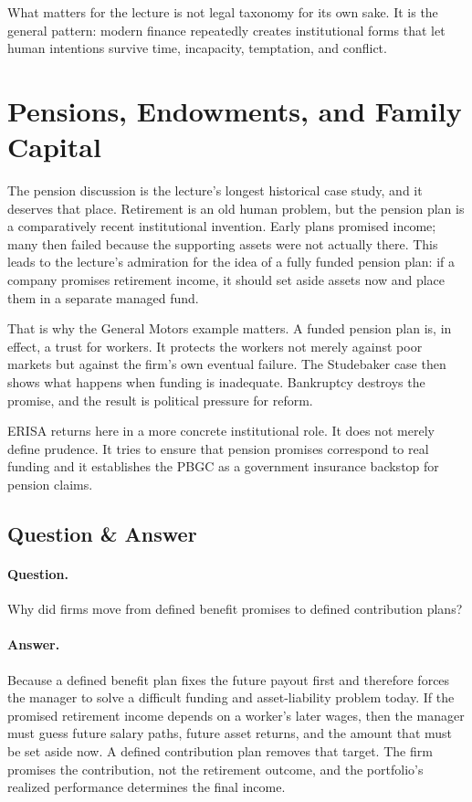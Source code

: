 What matters for the lecture is not legal taxonomy for its own sake. It is the general pattern: modern finance repeatedly creates institutional forms that let human intentions survive time, incapacity, temptation, and conflict.

\section{Pensions, Endowments, and Family Capital}

The pension discussion is the lecture's longest historical case study, and it deserves that place. Retirement is an old human problem, but the pension plan is a comparatively recent institutional invention. Early plans promised income; many then failed because the supporting assets were not actually there. This leads to the lecture's admiration for the idea of a fully funded pension plan: if a company promises retirement income, it should set aside assets now and place them in a separate managed fund.

That is why the General Motors example matters. A funded pension plan is, in effect, a trust for workers. It protects the workers not merely against poor markets but against the firm's own eventual failure. The Studebaker case then shows what happens when funding is inadequate. Bankruptcy destroys the promise, and the result is political pressure for reform.

ERISA returns here in a more concrete institutional role. It does not merely define prudence. It tries to ensure that pension promises correspond to real funding and it establishes the PBGC as a government insurance backstop for pension claims.

\subsection{Question \& Answer}

\paragraph{Question.} Why did firms move from defined benefit promises to defined contribution plans?

\paragraph{Answer.} Because a defined benefit plan fixes the future payout first and therefore forces the manager to solve a difficult funding and asset-liability problem today. If the promised retirement income depends on a worker's later wages, then the manager must guess future salary paths, future asset returns, and the amount that must be set aside now. A defined contribution plan removes that target. The firm promises the contribution, not the retirement outcome, and the portfolio's realized performance determines the final income.

